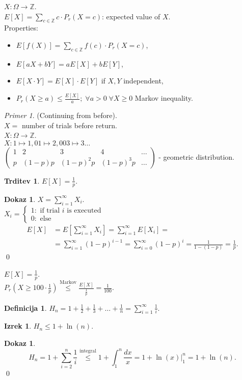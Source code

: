 \documentclass[a4paper, 12pt]{book}
\newcommand*\Eval[3]{\left.#1\right\rvert_{#2}^{#3}}
\theoremstyle{definition}
\newtheorem{defn}[counter]{Definicija}
\newtheorem{claim}[counter]{Trditev}
\newtheorem{theorem}[counter]{Izrek}
\newtheorem{pro}[counter]{Dokaz}
\theoremstyle{remark}
\newtheorem*{ex}{Primer}
\newcommand{\Z}{\mathbb{Z}}
\begin{document}
$X: \Omega \to \Z$. \\
$E[X] = \sum_{c \in \Z} c \cdot P_r(X = c)$: expected value of $X$. \\
Properties:
\begin{itemize}[label=$\circ$]
  \item $E[f(X)] = \sum_{c \in \Z} f(c) \cdot P_r(X = c)$,
  \item $E[aX + bY] = aE[X] + bE[Y]$,
  \item $E[X \cdot Y] = E[X] \cdot E[Y]$ if $X, Y$ independent,
  \item $P_r(X \geq a) \leq \frac{E[X]}{a}; \; \forall a > 0 \; \forall X \geq 0$ Markov inequality.
\end{itemize}
\begin{ex}
  (Continuing from before). \\
  $X =$ number of trials before return. \\
  $X: \Omega \to \Z$. \\
  $X: 1 \mapsto 1, 01 \mapsto 2, 003 \mapsto 3 \dots$ \\
  $\begin{pmatrix}
    1 & 2 & 3 & 4 & \dots \\
    p & (1-p)p & (1-p)^2 p & (1-p)^3p & \dots
  \end{pmatrix}$ - geometric distribution.
\end{ex}
\begin{claim}
  $E[X] = \frac{1}{p}$.
\end{claim}
\begin{pro}
  $X = \sum_{i=1}^{\infty} X_i$. \\
  $X_i = \begin{cases}
    1: \text{ if trial $i$ is executed} \\
    0: \text{ else}
  \end{cases}$ \\
  \begin{align*}
    E[X] &= E\left[\sum_{i=1}^{\infty} X_i\right] = \sum_{i=1}^{\infty} E[X_i] = \\
    &= \sum_{i=1}^{\infty} (1-p)^{i-1} = \sum_{i=0}^{\infty} (1-p)^i = \frac{1}{1-(1-p)} = \frac{1}{p}.
  \end{align*}
  \qed
\end{pro}
$E[X] = \frac{1}{p}$. \\
$P_r(X \geq 100 \cdot \frac{1}{p}) \stackrel{\text{Markov}}{\leq} \frac{E[X]}{\frac{1}{p}} = \frac{1}{100}$.
\begin{defn}
  $H_n = 1 + \frac{1}{2} + \frac{1}{3} + \dots + \frac{1}{n} = \sum_{i=1}^{\infty} \frac{1}{i}$.
\end{defn}
\begin{theorem}
  $H_n \leq 1 + \ln(n)$.
\end{theorem}
\begin{pro}
  \begin{equation*}
    H_n = 1 + \sum_{i=2}^{n} \frac{1}{i} \stackrel{\text{integral}}{\leq}
    1 + \int_{1}^{n} \frac{dx}{x} = 1 + \Eval{\ln(x)}{1}{n} = 1 + \ln(n).
  \end{equation*}
  \qed
\end{pro}
\end{document}
